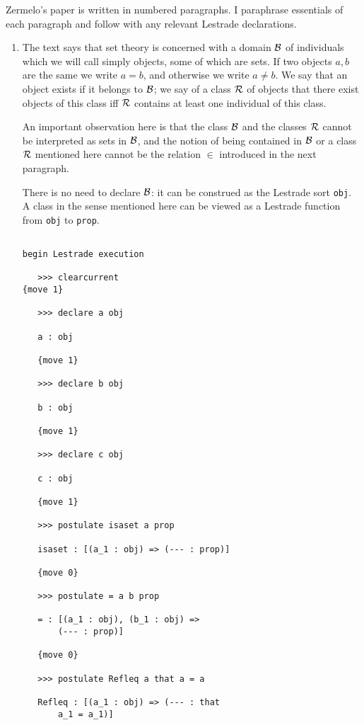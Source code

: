 \documentclass[12pt]{article}
\begin{document}
Zermelo's paper is written in numbered paragraphs.  I paraphrase essentials of each paragraph and follow with any relevant Lestrade declarations.

\begin{enumerate}

\item  The text says that set theory is concerned with a domain $\cal B$ of individuals which we will call simply objects, some of which are sets.  If two objects $a,b$ are the same we write $a=b$, and otherwise we write $a \neq b$.  We say that an object exists if it belongs to $\cal B$;  we say of a class $\cal R$ of objects that there exist objects of this class
iff $\cal R$ contains at least one individual of this class.

An important observation here is that the class $\cal B$ and the classes $\cal R$ cannot be interpreted as sets in $\cal B$,
and the notion of being contained in $\cal B$ or a class $\cal R$ mentioned here cannot be the relation $\in$ introduced in the next paragraph.

There is no need to declare $\cal B$:  it can be construed as the Lestrade sort {\tt obj}.  A class in the sense
mentioned here can be viewed as a Lestrade function from {\tt obj} to {\tt prop}.

\begin{verbatim}

begin Lestrade execution

   >>> clearcurrent
{move 1}

   >>> declare a obj

   a : obj

   {move 1}

   >>> declare b obj

   b : obj

   {move 1}

   >>> declare c obj

   c : obj

   {move 1}

   >>> postulate isaset a prop

   isaset : [(a_1 : obj) => (--- : prop)]

   {move 0}

   >>> postulate = a b prop

   = : [(a_1 : obj), (b_1 : obj) => 
       (--- : prop)]

   {move 0}

   >>> postulate Refleq a that a = a

   Refleq : [(a_1 : obj) => (--- : that 
       a_1 = a_1)]


\end{verbatim}
\end{enumerate}
\end{document}
